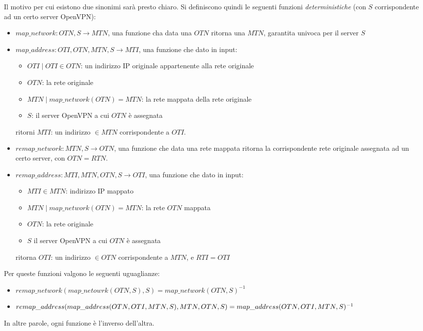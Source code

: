 Il motivo per cui esistono due sinonimi sarà presto chiaro. Si definiscono quindi
le seguenti funzioni \textit{deterministiche} (con $S$ corrispondente ad un certo
server OpenVPN):
\begin{itemize}
  \item $map\_network: OTN, S \rightarrow MTN$, una funzione cha data una
  $OTN$ ritorna una $MTN$, garantita univoca per il server $S$
  \item $map\_address: OTI, OTN, MTN, S \rightarrow MTI$,
  una funzione che dato in input:
  \begin{itemize}
    \item $OTI \mid OTI \in OTN$: un indirizzo IP originale appartenente alla
    rete originale
    \item $OTN$: la rete originale
    \item $MTN \mid map\_network(OTN)=MTN$: la rete mappata della rete originale
    \item $S$: il server OpenVPN a cui $OTN$ è assegnata
  \end{itemize}
  ritorni $MTI$: un indirizzo $\in MTN$ corrispondente a $OTI$.
  \item $remap\_network: MTN, S \rightarrow OTN$, una funzione che data una rete
  mappata ritorna la corrispondente rete originale assegnata ad un certo server,
  con $OTN=RTN$.
  \item $remap\_address: MTI, MTN, OTN, S \rightarrow OTI$, una funzione che dato
  in input:
  \begin{itemize}
    \item $MTI \in MTN$: indirizzo IP mappato
    \item $MTN \mid map\_network(OTN)=MTN$: la rete $OTN$ mappata
    \item $OTN$: la rete originale
    \item $S$  il server OpenVPN a cui $OTN$ è assegnata
  \end{itemize}
  ritorna $OTI$: un indirizzo $\in OTN$ corrispondente a $MTN$, e $RTI=OTI$
\end{itemize}
Per queste funzioni valgono le seguenti uguaglianze:
\begin{itemize}
  \item $remap\_network(map\_netowrk(OTN, S), S)=map\_network(OTN, S)^{-1}$
  \item
  $remap\_address(map\_address(OTN, OTI, MTN, S), MTN, OTN, S)=\\
    map\_address(OTN, OTI, MTN, S)^{-1}$
\end{itemize}
In altre parole, ogni funzione è l'inverso dell'altra.\\

